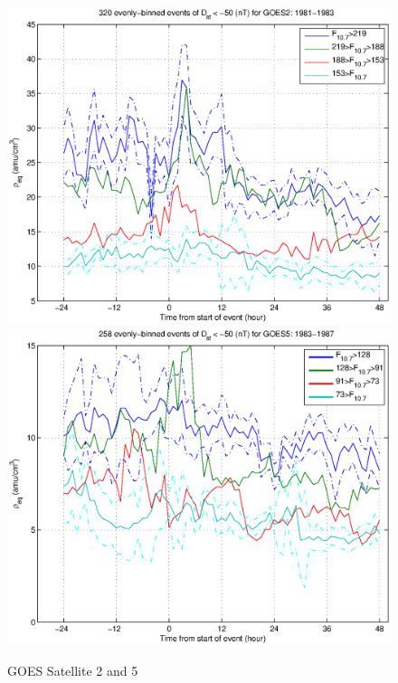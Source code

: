 \documentclass[10pt,twocolumn]{article}
\begin{document}
\begin{figure}[htp!]
\includegraphics[scale=0.45]{paperfigures/HighLowF107rhoeq-Dst50-GOES2-1981-1983.eps}
\includegraphics[scale=0.45]{paperfigures/HighLowF107rhoeq-Dst50-GOES5-1983-1987.eps}
\caption{GOES Satellite 2 and 5}
\label{GOES25}
\end{figure}
\clearpage
\end{document}
